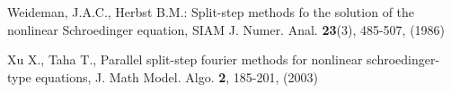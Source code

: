 \documentclass[a4paper,11pt]{article}
\begin{document}
\begin{thebibliography}{2}
Weideman, J.A.C., Herbst B.M.: Split-step methods fo the solution of the nonlinear Schroedinger equation, SIAM J. Numer. Anal. \textbf{23}(3), 485-507, (1986)

Xu X., Taha T., Parallel split-step fourier methods for nonlinear schroedinger-type equations, J. Math Model. Algo. \textbf{2}, 185-201, (2003)

\end{thebibliography}
\end{document}
